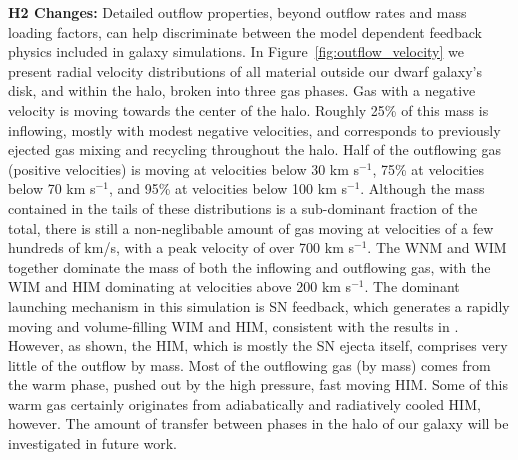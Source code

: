 \documentclass[fleqn,usenatbib,useAMS]{mnras}
\begin{document}
\textbf{H2 Changes:} Detailed outflow properties, beyond outflow rates and mass loading factors, can help discriminate between the model dependent feedback physics included in galaxy simulations. In Figure~\ref{fig:outflow_velocity} we present radial velocity distributions of all material outside our dwarf galaxy's disk, and within the halo, broken into three gas phases. Gas with a negative velocity is moving towards the center of the halo. Roughly 25\% of this mass is inflowing, mostly with modest negative velocities, and corresponds to previously ejected gas mixing and recycling throughout the halo. Half of the outflowing gas (positive velocities) is moving at velocities below 30 km s$^{-1}$, 75\% at velocities below 70 km s$^{-1}$, and 95\% at velocities below 100 km s$^{-1}$. Although the mass contained in the tails of these distributions is a sub-dominant fraction of the total, there is still a non-neglibable amount of gas moving at velocities of a few hundreds of km/s, with a peak velocity of over 700 km s$^{-1}$. The WNM and WIM together dominate the mass of both the inflowing and outflowing gas, with the WIM and HIM dominating at velocities above 200 km s$^{-1}$. The dominant launching mechanism in this simulation is SN feedback, which generates a rapidly moving and volume-filling WIM and HIM, consistent with the results in \citet{Hu2016,Hu2017}. However, as shown, the HIM, which is mostly the SN ejecta itself, comprises very little of the outflow by mass. Most of the outflowing gas (by mass) comes from the warm phase, pushed out by the high pressure, fast moving HIM. Some of this warm gas certainly originates from adiabatically and radiatively cooled HIM, however. The amount of transfer between phases in the halo of our galaxy will be investigated in future work.
\end{document}

